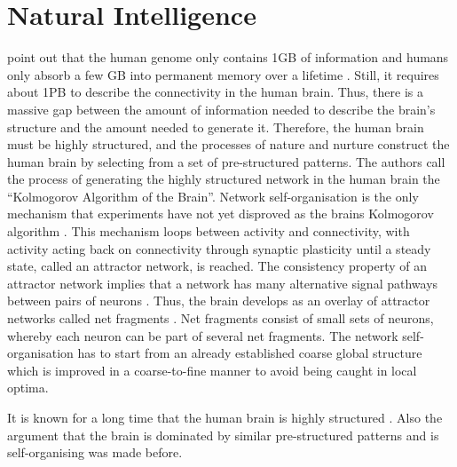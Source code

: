 \section{Natural Intelligence}
 point out that the human genome only contains 1GB of information and humans only absorb a few GB into permanent memory over a lifetime . Still, it requires about 1PB to describe the connectivity in the human brain.
Thus, there is a massive gap between the amount of information needed to describe the brain's structure and the amount needed to generate it.
Therefore, the human brain must be highly structured, and the processes of nature and nurture construct the human brain by selecting from a set of pre-structured patterns.
The authors call the process of generating the highly structured network in the human brain the ``Kolmogorov Algorithm  of the Brain''.
Network self-organisation is the only mechanism that experiments have not yet disproved as the brains Kolmogorov algorithm .
This mechanism loops between activity and connectivity, with activity acting back on connectivity through synaptic plasticity until a steady state, called an attractor network, is reached.
The consistency property of an attractor network implies that a network has many alternative signal pathways between pairs of neurons .
Thus, the brain develops as an overlay of attractor networks called net fragments .
Net fragments consist of small sets of neurons, whereby each neuron can be part of several net fragments.
The network self-organisation has to start from an already established coarse global structure which is improved in a coarse-to-fine manner to avoid being caught in local optima.

It is known for a long time that the human brain is highly structured \cite{gazzaniga_organization_1989, ackerman_discovering_1992, bassett_understanding_2011}. Also the argument that the brain is dominated by similar pre-structured patterns \cite{mountcastle_organizing_1978, mountcastle_columnar_1997} and is self-organising \cite{singer_brain_1986, kelso_selforganizing_1995, kelso_dynamic_1999} was made before.



